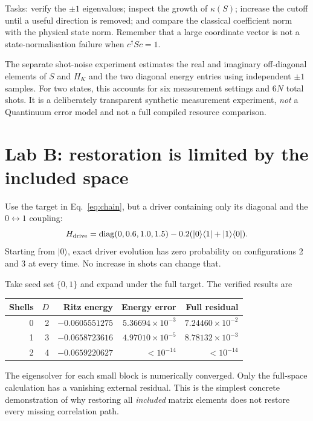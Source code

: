 \documentclass[11pt,a4paper,oneside]{report}
\newcommand{\ket}[1]{\lvert #1\rangle}
\newcommand{\bra}[1]{\langle #1\rvert}
\begin{document}
Tasks: verify the $\pm1$ eigenvalues; inspect the growth of $\kappa(S)$; increase the cutoff until a useful direction is removed; and compare the classical coefficient norm with the physical state norm. Remember that a large coordinate vector is not a state-normalisation failure when $c^\dagger Sc=1$.

The separate shot-noise experiment estimates the real and imaginary off-diagonal elements of $S$ and $H_K$ and the two diagonal energy entries using independent $\pm1$ samples. For two states, this accounts for six measurement settings and $6N$ total shots. It is a deliberately transparent synthetic measurement experiment, \emph{not} a Quantinuum error model and not a full compiled resource comparison.

\section{Lab B: restoration is limited by the included space}
Use the target in Eq.~\eqref{eq:chain}, but a driver containing only its diagonal and the $0\leftrightarrow1$ coupling:
\begin{equation}
H_{\rm drive}=\operatorname{diag}(0,0.6,1.0,1.5)
-0.2(\ket0\bra1+\ket1\bra0).
\end{equation}
Starting from $\ket0$, exact driver evolution has zero probability on configurations 2 and 3 at every time. No increase in shots can change that.

Take seed set $\{0,1\}$ and expand under the full target. The verified results are
\begin{center}
\begin{tabular}{@{}rrrrr@{}}
\toprule Shells & $D$ & Ritz energy & Energy error & Full residual\\\midrule
0 &2&$-0.0605551275$&$5.36694\times10^{-3}$&$7.24460\times10^{-2}$\\
1 &3&$-0.0658723616$&$4.97010\times10^{-5}$&$8.78132\times10^{-3}$\\
2 &4&$-0.0659220627$&$<10^{-14}$&$<10^{-14}$\\\bottomrule
\end{tabular}
\end{center}
The eigensolver for each small block is numerically converged. Only the full-space calculation has a vanishing external residual. This is the simplest concrete demonstration of why restoring all \emph{included} matrix elements does not restore every missing correlation path.
\end{document}
